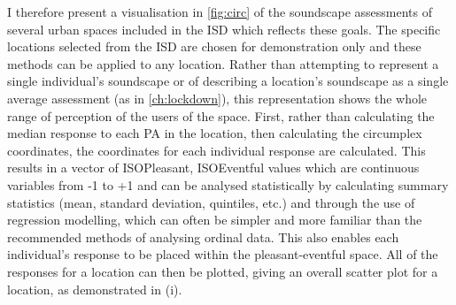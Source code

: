 I therefore present a visualisation in \cref{fig:circ} of the soundscape assessments of several urban spaces included in the ISD which reflects these goals. The specific locations selected from the ISD are chosen for demonstration only and these methods can be applied to any location. Rather than attempting to represent a single individual's soundscape or of describing a location's soundscape as a single average assessment (as in \cref{ch:lockdown}), this representation shows the whole range of perception of the users of the space. First, rather than calculating the median response to each PA in the location, then calculating the circumplex coordinates, the coordinates for each individual response are calculated. This results in a vector of ISOPleasant, ISOEventful values which are continuous variables from -1 to +1 and can be analysed statistically by calculating summary statistics (mean, standard deviation, quintiles, etc.) and through the use of regression modelling, which can often be simpler and more familiar than the recommended methods of analysing ordinal data. This also enables each individual's response to be placed within the pleasant-eventful space. All of the responses for a location can then be plotted, giving an overall scatter plot for a location, as demonstrated in (i).

